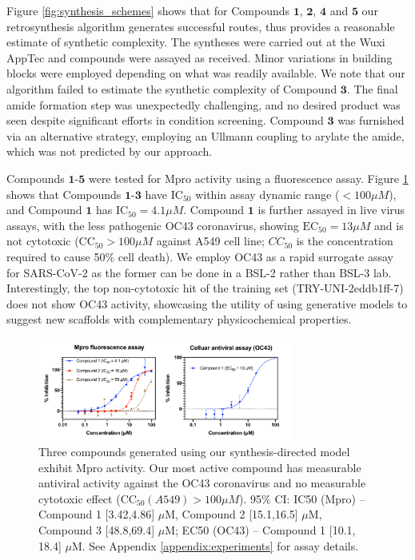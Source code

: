Figure \ref{fig:synthesis_schemes} shows that for Compounds $\mathbf{1}$, $\mathbf{2}$, $\mathbf{4}$ and $\mathbf{5}$ our retrosynthesis algorithm generates successful routes, thus provides a reasonable estimate of synthetic complexity. The syntheses were carried out at the Wuxi AppTec and compounds were assayed as received. Minor variations in building blocks were employed depending on what was readily available. We note that our algorithm failed to estimate the synthetic complexity of Compound $\mathbf{3}$. The final amide formation step was unexpectedly challenging, and no desired product was seen despite significant efforts in condition screening. Compound $\mathbf{3}$ was furnished via an alternative strategy, employing an Ullmann coupling to arylate the amide, which was not predicted by our approach. 

Compounds $\mathbf{1}$-$\mathbf{5}$ were tested for Mpro activity using a fluorescence assay. Figure \ref{fig:data} shows that Compounds $\mathbf{1}$-$\mathbf{3}$ have $\mathrm{IC}_{50}$ within assay dynamic range ($<100 \mu M$), and Compound $\mathbf{1}$ has $\mathrm{IC}_{50} = 4.1 \mu M$. Compound $\mathbf{1}$ is further assayed in live virus assays, with the less pathogenic OC43 coronavirus, showing $\mathrm{EC}_{50} = 13 \mu M$ and is not cytotoxic ($\mathrm{CC}_{50}>100 \mu M$ against A549 cell line; $CC_{50}$ is the concentration required  to cause 50\% cell death). We employ OC43 as a rapid surrogate assay for SARS-CoV-2 as the former can be done in a BSL-2 rather than BSL-3 lab.  Interestingly, the top non-cytotoxic hit of the training set (TRY-UNI-2eddb1ff-7) does not show OC43 activity, showcasing the utility of using generative models to suggest new scaffolds with complementary physicochemical properties. 

\begin{figure}
    \centering
    \includegraphics[width=0.75\textwidth]{Chapters/Ranking/Figs/data_curve.pdf}
    \caption{Three compounds generated using our synthesis-directed model exhibit Mpro activity. Our most active compound has measurable antiviral activity against the OC43 coronavirus and no measurable cytotoxic effect ($\mathrm{CC}_{50} (A549)>100 \mu M$). 95\% CI: IC50 (Mpro) -- Compound 1 [3.42,4.86] $\mu$M, Compound 2 [15.1,16.5] $\mu$M, Compound 3 [48.8,69.4] $\mu$M; EC50 (OC43) -- Compound 1 [10.1, 18.4] $\mu$M. See Appendix \ref{appendix:experiments} for assay details.}
    \label{fig:data}
\end{figure}

